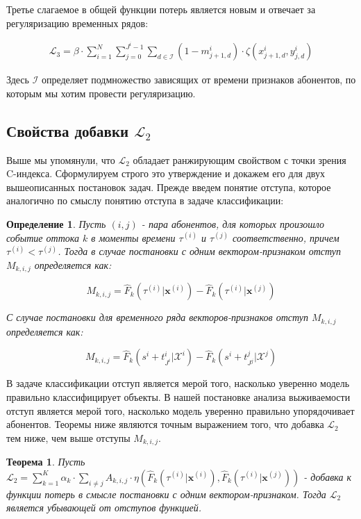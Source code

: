\documentclass{article}
\newtheorem{theorem}{Теорема}
\newtheorem{definition}{Определение}
\begin{document}
Третье слагаемое в общей функции потерь является новым и отвечает за регуляризацию временных рядов: 

\begin{equation}
	\begin{aligned}
		\mathcal{L}_3=\beta\cdot\sum_{i=1}^N\sum_{j=0}^{J^i-1}\sum_{d\in\mathcal{I}}(1-m_{j+1,d}^i)\cdot\zeta(x_{j+1,d}^i,y_{j,d}^i)	
	\end{aligned}
\end{equation}		

Здесь $\mathcal{I}$ определяет подмножество зависящих от времени признаков абонентов, по которым мы хотим провести регуляризацию. 

\subsection{Свойства добавки $\mathcal{L}_2$}

Выше мы упомянули, что $\mathcal{L}_2$ обладает ранжирующим свойством с точки зрения C-индекса. Сформулируем строго это утверждение и докажем его для двух вышеописанных постановок задач. Прежде введем понятие отступа, которое аналогично по смыслу понятию отступа в задаче классификации: 

\begin{definition}
Пусть $(i,j)$ - пара абонентов, для которых произошло событие оттока $k$ в моменты времени $\tau^{(i)}$ и $\tau^{(j)}$ соответственно, причем $\tau^{(i)} < \tau^{(j)}$. Тогда в случае постановки с одним вектором-признаком отступ $M_{k,i,j}$ определяется как: 

$$M_{k,i,j} = \hat{F}_k(\tau^{(i)}|\mathbf{x}^{(i)}) - \hat{F}_k(\tau^{(i)}|\mathbf{x}^{(j)}) $$ 

С случае постановки для временного ряда векторов-признаков отступ $M_{k,i,j}$ определяется как:

$$M_{k,i,j} = \hat{F}_k(s^i+t_{J^i}^i|\mathcal{X}^i) - \hat{F}_k(s^i+t_{J^j}^j|\mathcal{X}^j)$$

\end{definition}

В задаче классификации отступ является мерой того, насколько уверенно модель правильно классифицирует объекты. В нашей постановке анализа выживаемости отступ является мерой того, насколько модель уверенно правильно упорядочивает абонентов. Теоремы ниже являются точным выражением того, что добавка $\mathcal{L}_2$ тем ниже, чем выше отступы $M_{k,i,j}$. 

\begin{theorem}
	Пусть $\mathcal{L}_2 =\sum_{k=1}^K\alpha_k\cdot\sum_{i\neq j}A_{k,i,j}\cdot\eta\left(\hat{F}_k(\tau^{(i)}|\mathbf{x}^{(i)}),\hat{F}_k(\tau^{(i)}|\mathbf{x}^{(j)})\right)$ - добавка к функции потерь в смысле постановки с одним вектором-признаком. Тогда $\mathcal{L}_2$ является убывающей от отступов функцией.  
\end{theorem}
\end{document}
